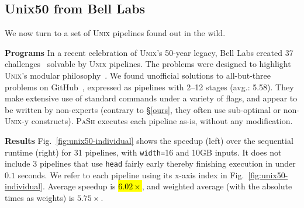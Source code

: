 \documentclass[sigplan, review, screen, anonymous]{acmart}
\newcommand{\heading}[1]{\vspace{4pt}\noindent\textbf{#1}\enspace}
\newcommand{\ttt}[1]{\texttt{#1}}
\newcommand{\todo}[1]{\hl{#1}\xspace}
\newcommand{\kk}[1]{[{\color{magenta}kk: #1}]}
\newcommand{\sys}{{\scshape PaSh}\xspace}
\newcommand{\unix}{{\scshape Unix}\xspace}
\begin{document}
\subsection{Unix50 from Bell Labs}
\label{unix50}

We now turn to a set of \unix pipelines found out in the wild.

\heading{Programs}
In a recent celebration of \unix's 50-year legacy, Bell Labs created 37 challenges~\cite{unix50} solvable by \unix pipelines.
The problems were designed to highlight \unix's modular philosophy~\cite{mcilroy1978unix}.
We found unofficial solutions to all-but-three problems on GitHub~\cite{unix50sol}, expressed as pipelines with 2--12 stages (avg.: 5.58).
They make extensive use of standard commands under a variety of flags, and appear to be written by non-experts (contrary to \S\ref{ours}, they often use sub-optimal or non-\unix-y constructs).
\sys executes each pipeline as-is, without any modification.


\heading{Results}
Fig.~\ref{fig:unix50-individual} shows the speedup (left) over the sequential runtime (right) for 31 pipelines, with \ttt{width=}16 and 10GB inputs.
It does not include 3 pipelines that use \ttt{head} fairly early thereby finishing execution in under $0.1$ seconds.
We refer to each pipeline using its x-axis index in Fig.~\ref{fig:unix50-individual}.
Average speedup is \todo{$6.02\times$}, %
  and weighted average (with the absolute times as weights) is $5.75\times$.
\end{document}
